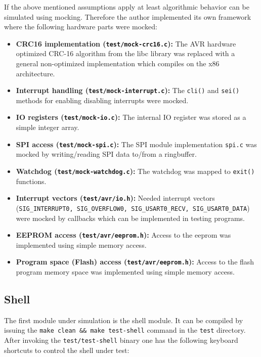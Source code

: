 If the above mentioned assumptions apply at least algorithmic behavior can be simulated using mocking. Therefore the author implemented its own framework where the following hardware parts were mocked:

\begin{itemize}
    \item \textbf{CRC16 implementation (\texttt{test/mock-crc16.c}):} The AVR hardware optimized CRC-16 algorithm from the libc library was replaced with a general non-optimized implementation which compiles on the x86 architecture.
    \item \textbf{Interrupt handling (\texttt{test/mock-interrupt.c}):} The \texttt{cli()} and \texttt{sei()} methods for enabling disabling interrupts were mocked.
    \item \textbf{IO registers (\texttt{test/mock-io.c}):} The internal IO register was stored as a simple integer array.
    \item \textbf{SPI access (\texttt{test/mock-spi.c}):} The SPI module implementation \texttt{spi.c} was mocked by writing/reading SPI data to/from a ringbuffer.
    \item \textbf{Watchdog (\texttt{test/mock-watchdog.c}):} The watchdog was mapped to \texttt{exit()} functions.
    \item \textbf{Interrupt vectors (\texttt{test/avr/io.h}):} Needed interrupt vectors (\texttt{SIG\_INTERRUPT0, SIG\_OVERFLOW0, SIG\_USART0\_RECV, SIG\_USART0\_DATA}) were mocked by callbacks which can be implemented in testing programs.
    \item \textbf{EEPROM access (\texttt{test/avr/eeprom.h}):} Access to the eeprom was implemented using simple memory access.
    \item \textbf{Program space (Flash) access (\texttt{test/avr/eeprom.h}):} Access to the flash program memory space was implemented using simple memory access.
\end{itemize}

\subsection{Shell}%
The first module under simulation is the shell module. It can be compiled by issuing the \texttt{make clean \&\& make test-shell} command in the \texttt{test} directory. After invoking the \texttt{test/test-shell} binary one has the following keyboard shortcuts to control the shell under test:

